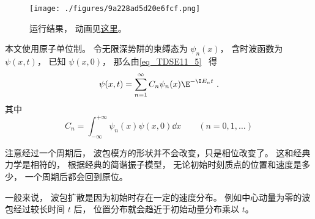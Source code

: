 

\begin{figure}[ht]
\centering
\texttt{[image: ./figures/9a228ad5d20e6fcf.png]}
\caption{运行结果， 动画见\href{https://wuli.wiki/apps/SHOgs.html}{这里}。} \label{fig_SHOgs_1}
\end{figure}

本文使用原子单位制。 令无限深势阱的束缚态为 $\psi_n(x)$， 含时波函数为 $\psi(x, t)$， 已知 $\psi(x, 0)$， 那么由\autoref{eq_TDSE11_5}~ 得
\begin{equation}
\psi(x, t) = \sum_{n=1}^\infty C_n\psi_n(x)\E^{-\I E_n t}~.
\end{equation}
其中
\begin{equation}
C_n = \int_{-\infty}^{+\infty} \psi_n(x)\psi(x, 0) \dd{x} \qquad (n=0,1,\dots)
\end{equation}

注意经过一个周期后， 波包模方的形状并不会改变，只是相位改变了。 这和经典力学是相符的， 根据经典的简谐振子模型， 无论初始时刻质点的位置和速度是多少， 一个周期后都会回到原位。

一般来说， 波包扩散是因为初始时存在一定的速度分布。 例如中心动量为零的波包经过较长时间 $t$ 后， 位置分布就会趋近于初始动量分布乘以 $t$。

